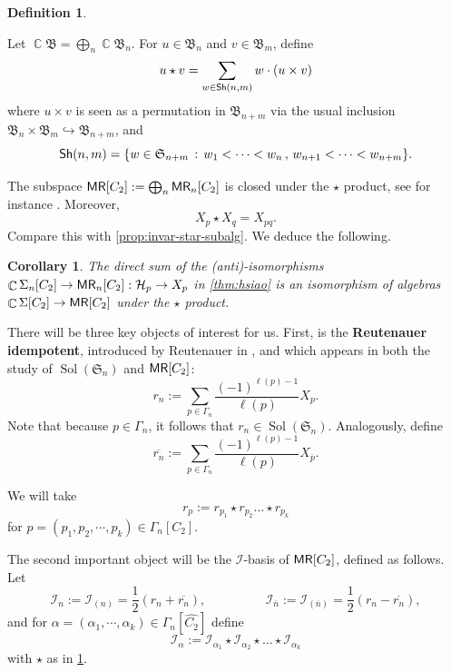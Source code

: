 \documentclass[11pt, oneside, reqno]{amsart}
\newtheorem{cor}[theorem]{Corollary}
\theoremstyle{definition}
\newtheorem{definition}[theorem]{Definition}
\numberwithin{equation}{section}
\DeclareMathOperator{\C}{\mathbb{C}}
\newcommand{\defn}[1]{{\color{RoyalBlue}\bf#1}}
\def \MR {{\sf{MR}}}
\def \kk{\C}
\def \ol{\overline}
\def \sym{\mathfrak{S}}
\def \I {{\mathcal{I}}}
\def \ztwo {{C_2}}
\def \ztwodual {{\widehat{\ztwo}}}
\def \ztwocompositiondual{{\Gamma_n[\ztwodual]}}
\DeclareMathOperator{\sol}{Sol}
\newcommand{\SB}[1]{\mathcal{#1}} 		%
\begin{document}
\begin{definition}\label{def:staronmr}
  
Let $\kk \mathfrak{B} = \bigoplus_n \kk \mathfrak{B}_n$. For $u \in \mathfrak{B}_n$ and $v \in \mathfrak{B}_m$, define
\[
    u \star v = \sum_{w \in {\sf Sh}(n,m)} w \cdot (u \times v)
\]
where $u \times v$ is seen as a permutation in $\mathfrak{B}_{n+m}$ via the usual inclusion $\mathfrak{B}_n \times \mathfrak{B}_m \hookrightarrow \mathfrak{B}_{n+m}$, and
\[
    {\sf Sh}(n,m) = \{ w \in \sym_{n+m} \,:\, w_1 < \dots < w_n \,,\, w_{n+1} < \dots < w_{n+m} \}.
\]  
\end{definition}
The subspace $\MR[\ztwo] := \bigoplus_n \MR_n[\ztwo]$ is closed under the $\star$ product, see for instance \cite[\S 8.2]{abn04peak}.
Moreover,
\begin{equation}\label{eq:starMR-X-basis}
    X_p \star X_q = X_{pq}.
\end{equation}
Compare this with \cref{prop:invar-star-subalg}.
We deduce the following.

\begin{cor}\label{c:isoexternalprod}
    The direct sum of the (anti)-isomorphisms $\kk \Sigma_n[\ztwo] \to \MR_n[\ztwo] : \SB{H}_p \to X_p$ in \cref{thm:hsiao} is an isomorphism of algebras $\kk \Sigma[\ztwo] \to \MR[\ztwo]$ under the $\star$ product.
\end{cor}

There will be three key objects of interest for us. 
First, is the 
 \defn{Reutenauer idempotent}, introduced by Reutenauer in \cite[\S 8.4]{reutenauer2001free}, and which appears in both the study of $\sol(\sym_n)$ and $\MR[\ztwo]$:
\[ r_{n} := \sum_{p \in \Gamma_n}  \frac{(-1)^{\ell(p)-1}}{\ell(p)} X_{p}.\]
Note that because $p \in \Gamma_n$, it follows that $r_{n}\in \sol(\sym_n)$. Analogously, define 
\[ \ol{r_n}:=  \sum_{p \in \Gamma_n}  \frac{(-1)^{\ell(p)-1}}{\ell(p)} X_{\ol{p}}.\]

We will take 
\[ r_{p}:= r_{p_1} \star r_{p_2} \dots \star r_{p_k}\]
for $p = (p_1, p_2, \cdots, p_k) \in \Gamma_n[\ztwo]$. 

The second important object will be the $\I$-basis of $\MR[\ztwo]$, defined as follows. Let 
\[ \I_n:= \I_{(n)}= \frac{1}{2} (r_n + \ol{r_n}), \qquad \text{  } \qquad \I_{\ol{n}}:= \I_{(\ol{n})}= \frac{1}{2}(r_n - \ol{r_n}),\]
and for $\alpha = (\alpha_1, \cdots, \alpha_k) \in  \ztwocompositiondual$ define
\[ \I_\alpha := \I_{\alpha_1} \star \I_{\alpha_2} \star \dots \star \I_{\alpha_k}\]
with $\star$ as in \cref{def:staronmr}.
\end{document}
